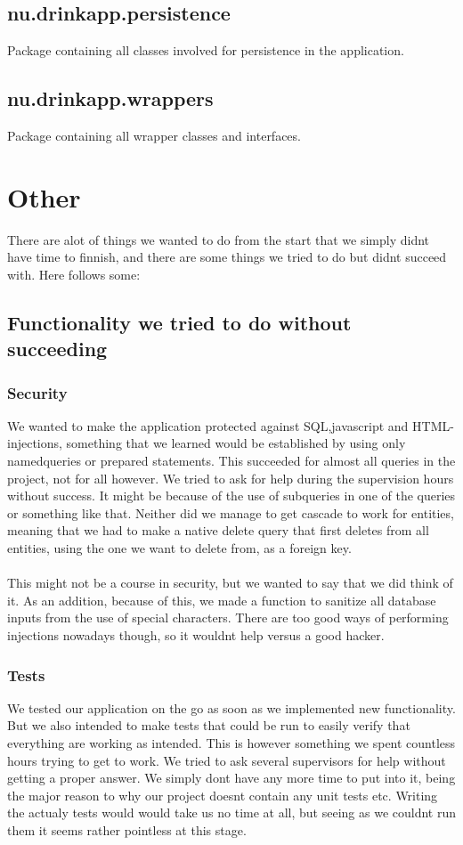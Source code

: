 \documentclass[a4paper]{article}
\begin{document}
\subsection{nu.drinkapp.persistence}
Package containing all classes involved for persistence in the application.

\subsection{nu.drinkapp.wrappers}
Package containing all wrapper classes and interfaces.

\section{Other}
There are alot of things we wanted to do from the start that we simply didnt have time to finnish, and there are some things we tried to do but didnt succeed with. Here follows some:

\subsection{Functionality we tried to do without succeeding}

\subsubsection{Security}
We wanted to make the application protected against SQL,javascript and HTML-injections, something that we learned would be established by using only namedqueries or prepared statements. This succeeded for almost all queries in the project, not for all however. We tried to ask for help during the supervision hours without success. It might be because of the use of subqueries in one of the queries or something like that. Neither did we manage to get cascade to work for entities, meaning that we had to make a native delete query that first deletes from all entities, using the one we want to delete from, as a foreign key. \\
\\
This might not be a course in security, but we wanted to say that we did think of it.
As an addition, because of this, we made a function to sanitize all database inputs from the use of special characters. There are too good ways of performing injections nowadays though, so it wouldnt help versus a good hacker.

\subsubsection{Tests}
We tested our application on the go as soon as we implemented new functionality. But we also intended to make tests that could be run to easily verify that everything are working as intended. This is however something we spent countless hours trying to get to work. We tried to ask several supervisors for help without getting a proper answer. We simply dont have any more time to put into it, being the major reason to why our project doesnt contain any unit tests etc. Writing the actualy tests would would take us no time at all, but seeing as we couldnt run them it seems rather pointless at this stage.
\end{document}
